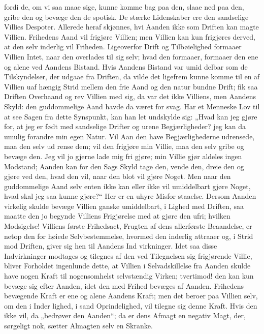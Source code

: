 \documentclass[12pt]{book}
\newcommand{\opage}[1]{\marginnote{\footnotesize\textit{[#1]}}}
\begin{document}
fordi de, om vi saa maae sige, kunne komme bag paa
den, slaae ned paa den, gribe den og bevæge den de\-%
spotisk. De stærke Lidenskaber ere den sandselige
Villies Despoter. Allerede heraf skjønnes, hvi Aanden
ikke som Driften kan magte Villien. Frihedens Aand
vil frigjøre Villien; men Villien kan kun frigjøres derved,
at den selv inderlig vil Friheden. Ligeoverfor Drift og
\opage{11}\setcounter{footnote}{0}%
Tilbøielighed formaaer Villien Intet, naar den overlades til
sig selv; hvad den formaaer, formaaer den ene og alene
ved Aandens Bistand. Hvis Aandens Bistand var umid\-%
delbar som de Tilskyndelser, der udgaae fra Driften, da
vilde det ligefrem kunne komme til en af Villien uaf\-%
hængig Strid mellem den frie Aand og den natur\-%
bundne Drift; fik saa Driften Overhaand og rev Villien
med sig, da var det ikke Villiens, men Aandens Skyld:
den guddommelige Aand havde da været for svag. Har et
Menneske Lov til at see Sagen fra dette Synspunkt, kan
han let undskylde sig: „Hvad kan jeg gjøre for, at jeg
er født med sandselige Drifter og urene Begjærligheder?
jeg kan da umulig forandre min egen Natur. Vil Aan\-%
den have Begjærlighederne udrensede, maa den selv ud\-%
rense dem; vil den frigjøre min Villie, maa den selv
gribe og bevæge den. Jeg vil jo gjerne lade mig fri\-%
gjøre; min Villie gjør aldeles ingen Modstand; Aanden
kan for den Sags Skyld tage den, vende den, dreie den
og gjøre ved den, hvad den vil, naar den blot vil gjøre
Noget. Men naar den guddommelige Aand selv enten
ikke kan eller ikke vil umiddelbart gjøre Noget, hvad
skal jeg saa kunne gjøre?“ Her er en uhyre Misfor\-%
staaelse. Dersom Aanden virkelig skulde bevæge Villien
ganske umiddelbart, i Lighed med Driften, saa maatte
den jo begynde Villiens Frigjørelse med at gjøre den
ufri; hvilken Modsigelse! Villiens første Frihedsact,
Frugten af dens allerførste Beaandelse, er netop den for\-%
høiede Selvbestemmelse, hvormed den inderlig attraaer
og, i Strid mod Driften, giver sig hen til Aandens Ind\-%
virkninger. Idet saa disse Indvirkninger modtages og
tilegnes af den ved Tilegnelsen sig frigjørende Villie, bliver
Forholdet ingenlunde dette, at Villien i Selvadskillelse
fra Aanden skulde have nogen Kraft til nogensomhelst
selvstændig Virken; tvertimod! den kan kun bevæge sig
\opage{12}\setcounter{footnote}{0}%
efter Aanden, idet den med Frihed bevæges af Aanden.
Frihedens bevægende Kraft er ene og alene Aandens
Kraft; men det beroer paa Villien selv, om den i Inder\-%
lighed, i sand Oprindelighed, vil tilegne sig denne Kraft.
Hvis den ikke vil, da „bedrøver den Aanden“; da er
dens Afmagt en negativ Magt, der, sørgeligt nok, sætter
Almagten selv en Skranke.
\end{document}
